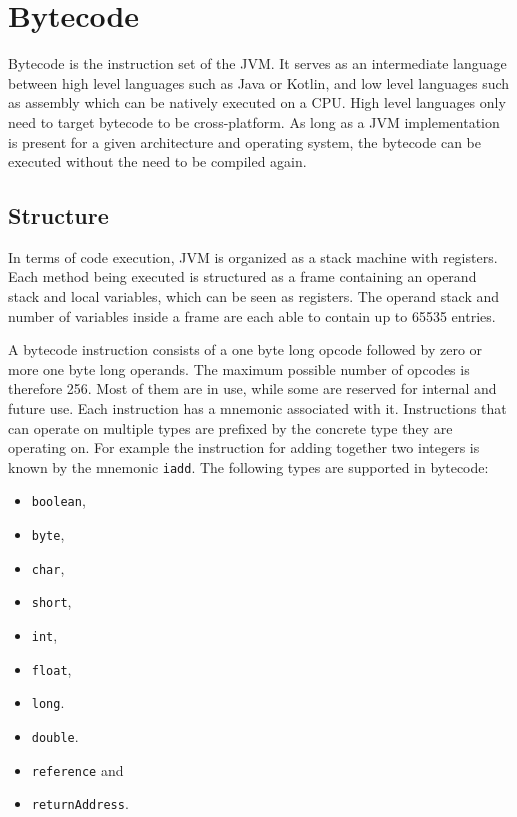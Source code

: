 \section{Bytecode}

Bytecode is the instruction set of the JVM. It serves as an intermediate language between high level languages such as Java or Kotlin, and low level languages such as assembly which can be natively executed on a CPU. High level languages only need to target bytecode to be cross-platform. As long as a JVM implementation is present for a given architecture and operating system, the bytecode can be executed without the need to be compiled again. 

\subsection{Structure}

In terms of code execution, JVM is organized as a stack machine with registers. Each method being executed is structured as a frame containing an operand stack and local variables, which can be seen as registers. The operand stack and number of variables inside a frame are each able to contain up to 65535 entries.

A bytecode instruction consists of a one byte long opcode followed by zero or more one byte long operands. The maximum possible number of opcodes is therefore 256. Most of them are in use, while some are reserved for internal and future use. Each instruction has a mnemonic associated with it. Instructions that can operate on multiple types are prefixed by the concrete type they are operating on. For example the instruction for adding together two integers is known by the mnemonic \texttt{iadd}. The following types are supported in bytecode:

\begin{itemize}
    \item \texttt{boolean},
    \item \texttt{byte},
    \item \texttt{char},
    \item \texttt{short},
    \item \texttt{int},
    \item \texttt{float},
    \item \texttt{long}.
    \item \texttt{double}.
    \item \texttt{reference} and
    \item \texttt{returnAddress}.

\end{itemize}


